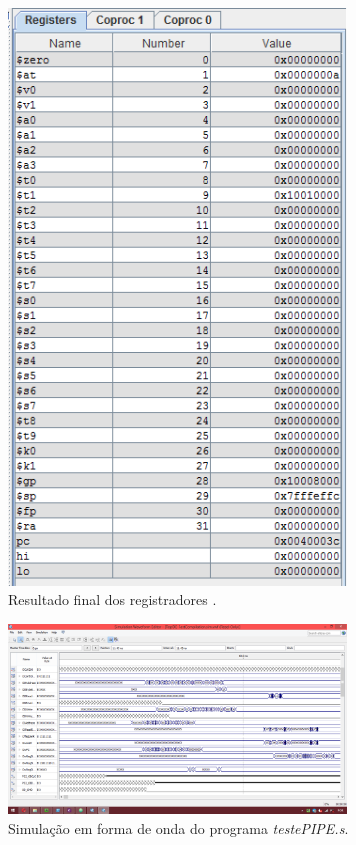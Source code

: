 \documentclass[12pt, a4paper, twoside]{article}
\begin{document}
\begin{figure}
    \centering
    \includegraphics[width=0.8\textwidth]{./figs/testepipereg.png}
    \caption{Resultado final dos registradores .}
\end{figure}

\begin{figure}
    \centering
    \includegraphics[width=0.8\textwidth]{./figs/simw.png}
    \caption{Simulação em forma de onda do programa \textit{testePIPE.s}.}
\end{figure}
\end{document}
